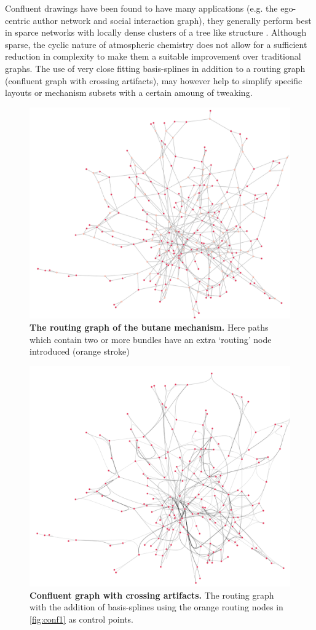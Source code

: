 Confluent drawings have been found to have many applications (e.g. the ego-centric author network and social interaction graph), they generally perform best in sparce networks with locally dense clusters of a tree like structure \citep{confluent17}. Although sparse, the cyclic nature of atmospheric chemistry does not allow for a sufficient reduction in complexity to make them a suitable improvement over traditional graphs. The use of very close fitting basis-splines in addition to a routing graph (confluent graph with crossing artifacts), may however help to simplify specific layouts or mechanism subsets with a certain amoung of tweaking. 

\begin{figure}[H]
     \centering
     \includegraphics[width=.7\textwidth]{figures_c1/layout/confluent/1.png}
        \caption{\textbf{The routing graph of the butane mechanism.} Here paths which contain two or more bundles have an extra `routing' node introduced (orange stroke) }
      \label{fig:conf1}
\end{figure}

\begin{figure}[H]
     \centering
     \includegraphics[width=.7\textwidth]{figures_c1/layout/confluent/2.png}
        \caption{\textbf{Confluent graph with crossing artifacts.} The routing graph with the addition of basis-splines using the orange routing nodes in \autoref{fig:conf1} as control points.}
      \label{fig:conf2}
\end{figure}


